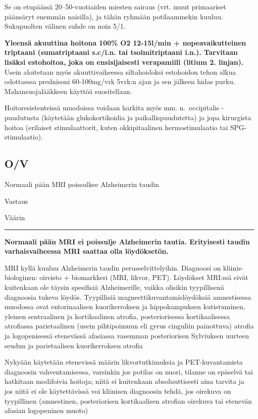 \documentclass[
]{book}
\begin{document}
Se on etupäässä 20--50-vuotiaiden miesten sairaus (vrt. muut primaariset päänsäryt enemmän naisilla), ja tähän ryhmään potilaammekin kuuluu. Sukupuolten välinen suhde on noin 5/1.

\textbf{Yleensä akuuttina hoitona 100\% O2 12-15l/min + nopeavaikutteinen triptaani (sumatriptaani s.c/i.n. tai tsolmitriptaani i.n.). Tarvitaan lisäksi estohoitoa, joka on ensisijaisesti verapamiili (litium 2. linjan).} Usein aloitetaan myös akuuttivaiheessa siltahoidoksi estohoidon tehon alkua odottaessa prednisoni 60-100mg/vrk 5vrk:n ajan ja sen jälkeen hidas purku. Mahansuojalääkkeen käyttöä suositellaan.

Hoitoresistenteissä muodoissa voidaan harkita myös mm. n.~occipitalis -puudutusta (käytetään glukokortikoidia ja paikallispuudutetta) ja jopa kirurgista hoitoa (erilaiset stimulaattorit, kuten okkipitaalinen hermostimulaatio tai SPG-stimulaatio).

\subsection{O/V}\label{ov-28}

Normaali pään MRI poissulkee Alzheimerin taudin

Vastaus

Väärin

\begin{center}\rule{0.5\linewidth}{0.5pt}\end{center}

\textbf{Normaali pään MRI ei poissulje Alzheimerin tautia. Erityisesti taudin varhaisvaiheessa MRI saattaa olla löydöksetön.}

MRI kyllä kuuluu Alzheimerin taudin perusselvittelyihin. Diagnoosi on kliinis-biologinen: oireisto + biomarkkeri (MRI, likvor, PET). Löydökset MRI:ssä eivät kuitenkaan ole täysin spesifisiä Alzheimerille, vaikka olisikin tyypillisenä diagnoosia tukeva löydös. Tyypillisiä magneettikuvantamislöydöksiä amnestisessa muodossa ovat entorinaalisen kuorikerroksen ja hippokampuksen kutistuminen, yleinen sentraalinen ja kortikaalinen atrofia, posteriorisessa kortikaalisessa atrofiassa parietaalinen (usein pihtipoimuun eli gyrus cinguliin painottuva) atrofia ja logopenisessä etenevässä afasiassa vasemman posteriorisen Sylviuksen uurteen seudun ja parietaalisen kuorikerroksen atrofia

Nykyään käytetään etenevissä määrin likvortutkimuksia ja PET-kuvantamista diagnoosin vahventamisessa, varsinkin jos potilas on nuori, tilanne on epäselvä tai hatkitaan modifoivia hoitoja; niitä ei kuitenkaan absoluuttisesti aina tarvita ja jos niitä ei ole käytettävissä voi kliinisen diagnoosin tehdä, jos oirekuva on tyypillinen (amnestinen, posteriorisen kortikaalisen atrofian oirekuva tai etenevän afasian logopeninen muoto)
\end{document}
